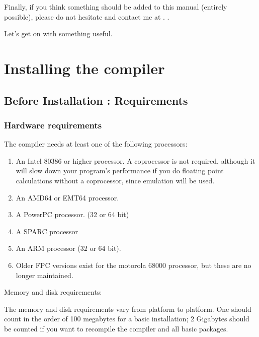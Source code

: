 Finally, if you think something should be added to this manual
(entirely possible), please do not hesitate and contact me at
.
.

Let's get on with something useful.


\chapter{Installing the compiler}
\label{ch:Installation}

\section{Before Installation : Requirements}

%
%
\subsection{Hardware requirements}
The compiler needs at least one of the following processors:
\begin{enumerate}
\item An Intel 80386 or higher processor. A coprocessor
is not required, although it will slow down your program's performance if you do
floating point calculations without a coprocessor, since emulation will be used.
\item An AMD64 or EMT64 processor.
\item A PowerPC processor. (32 or 64 bit)
\item A SPARC processor
\item An ARM processor (32 or 64 bit).
\item Older FPC versions exist for the motorola 68000 processor,
but these are no longer maintained.
\end{enumerate}


Memory and disk requirements:

The memory and disk requirements vary from platform to platform. One should
count in the order of 100 megabytes for a basic installation; 2 Gigabytes should
be counted if you want to recompile the compiler and all basic packages.

